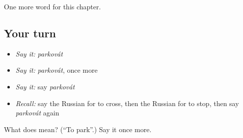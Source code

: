 \begin{grammarlens}[title={What you've built}]
One more word for this chapter.
\end{grammarlens}

\subsection*{Your turn}
\begin{itemize}
\raggedright
  \item \emph{Say it:} \emph{parkovát}
  \item \emph{Say it:} \emph{parkovát}, once more
  \item \emph{Say it:} say \emph{parkovát}
  \item \emph{Recall:} say the Russian for to cross, then the Russian for to stop, then say \emph{parkovát} again
\end{itemize}

\begin{tcolorbox}[breakable,colback=teal!4,colframe=teal!35!black,title={Before you move on}]
What does  mean? (\textquotedblleft{}To park\textquotedblright{}.) Say it once more.
\end{tcolorbox}
